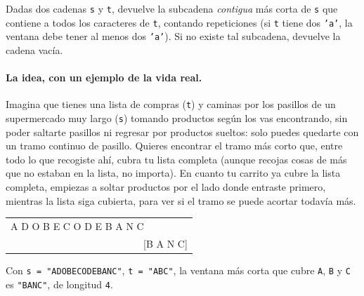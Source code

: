 
Dadas dos cadenas \texttt{s} y \texttt{t}, devuelve la subcadena
\emph{contigua} más corta de \texttt{s} que contiene a todos los caracteres
de \texttt{t}, contando repeticiones (si \texttt{t} tiene dos \texttt{'a'},
la ventana debe tener al menos dos \texttt{'a'}). Si no existe tal
subcadena, devuelve la cadena vacía.

\paragraph{La idea, con un ejemplo de la vida real.} Imagina que tienes una
lista de compras (\texttt{t}) y caminas por los pasillos de un supermercado
muy largo (\texttt{s}) tomando productos según los vas encontrando, sin
poder saltarte pasillos ni regresar por productos sueltos: solo puedes
quedarte con un tramo continuo de pasillo. Quieres encontrar el tramo más
corto que, entre todo lo que recogiste ahí, cubra tu lista completa (aunque
recojas cosas de más que no estaban en la lista, no importa). En cuanto tu
carrito ya cubre la lista completa, empiezas a soltar productos por el lado
donde entraste primero, mientras la lista siga cubierta, para ver si el
tramo se puede acortar todavía más.

\begin{center}
\ttfamily
\begin{tabular}{l}
A D O B E C O D E B A N C\\
$\phantom{AAAAAAAAAAAAAAAAAA}$[B A N C]\\
\end{tabular}
\end{center}

\noindent Con \texttt{s = "ADOBECODEBANC"}, \texttt{t = "ABC"}, la ventana
más corta que cubre \texttt{A}, \texttt{B} y \texttt{C} es \texttt{"BANC"},
de longitud \texttt{4}.

